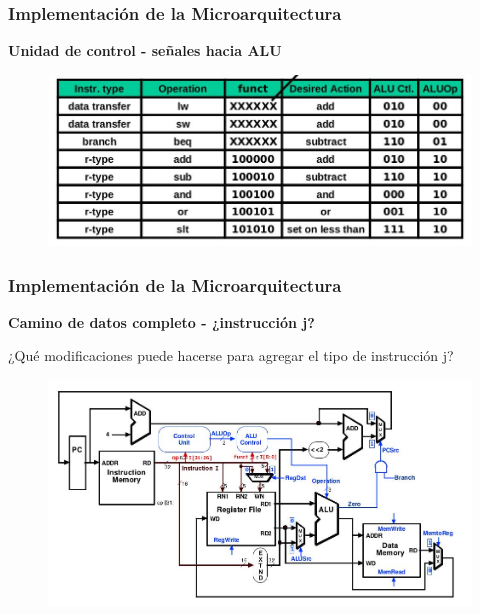 \documentclass[aspectratio=169,compress]{beamer}
\begin{document}
\begin{footnotesize}
\begin{frame}
\frametitle{Implementación de la Microarquitectura}
\begin{center}\textbf{Unidad de control - señales hacia ALU}\end{center}
\begin{figure}
\includegraphics[scale=0.3]{images/alu-signals.jpg} 
\end{figure}

\end{frame}



\begin{frame}
\frametitle{Implementación de la Microarquitectura}
\begin{center}\textbf{Camino de datos completo - ¿instrucción j?}\end{center}
¿Qué modificaciones puede hacerse para agregar el tipo de instrucción j?
\begin{figure}
\includegraphics[scale=0.3]{images/cpu-completa.jpg} 
\end{figure}

\end{frame}




\end{footnotesize}
\end{document}
